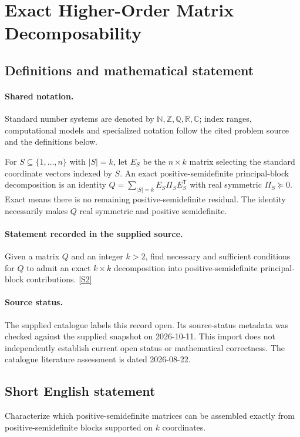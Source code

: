 \documentclass[11pt]{article}
\newcommand{\sref}[2]{\hyperlink{source:#1:#2}{[S#2]}}
\begin{document}
\section{Exact Higher-Order Matrix Decomposability}\label{statement}

\subsection{Definitions and mathematical statement}

\paragraph{Shared notation.}Standard number systems are denoted by $\mathbb N,\mathbb Z,\mathbb Q,\mathbb R,\mathbb C$; index ranges, computational models and specialized notation follow the cited problem source and the definitions below.


For $S\subseteq\{1,\ldots,n\}$ with $|S|=k$, let $E_S$ be the $n\times k$ matrix selecting the standard coordinate vectors indexed by $S$. An exact positive-semidefinite principal-block decomposition is an identity $Q=\sum_{|S|=k}E_S\Pi_SE_S^{\mathsf T}$ with real symmetric $\Pi_S\succeq0$. Exact means there is no remaining positive-semidefinite residual. The identity necessarily makes $Q$ real symmetric and positive semidefinite.
\paragraph{Statement recorded in the supplied source.}
Given a matrix $Q$ and an integer $k>2$, find necessary and sufficient conditions for $Q$ to admit an exact $k\times k$ decomposition into positive-semidefinite principal-block contributions. \sref{statement}{2}
\paragraph{Source status.}
The supplied catalogue labels this record open. Its source-status metadata was checked against the supplied snapshot on 2026-10-11. This import does not independently establish current open status or mathematical correctness. The catalogue literature assessment is dated 2026-08-22.
\subsection{Short English statement}
Characterize which positive-semidefinite matrices can be assembled exactly from positive-semidefinite blocks supported on $k$ coordinates.
\end{document}
